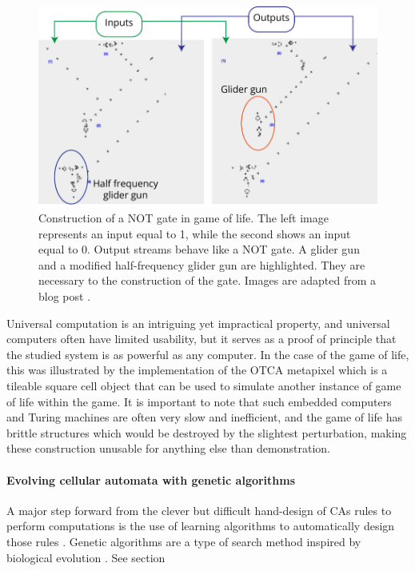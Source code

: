 \begin{figure}[htbp]
  \centering
  \includegraphics[width=.8\linewidth]{figures/gol_not_gate}
  \caption{Construction of a NOT gate in game of life. The left image represents
    an input equal to 1, while the second shows an input equal to 0. Output
    streams behave like a NOT gate. A glider gun and a modified half-frequency
    glider gun are highlighted. They are necessary to the construction of the
    gate. Images are adapted from a blog post
    \parencite{carliniDigitalLogicGates2020}.}
  \label{fig:gol_not_gate}
\end{figure}

Universal computation is an intriguing yet impractical property, and universal
computers often have limited usability, but it serves as a proof of principle
that the studied system is as powerful as any computer. In the case of the game
of life, this was illustrated by the implementation of the OTCA metapixel which
is a tileable square cell object that can be used to simulate another instance
of game of life within the game. It is important to note that such embedded
computers and Turing machines are often very slow and inefficient, and the game
of life has brittle structures which would be destroyed by the slightest
perturbation, making these construction unusable for anything else than
demonstration.

\paragraph{Evolving cellular automata with genetic algorithms}
A major step forward from the clever but difficult hand-design of \acp{CA} rules
to perform computations is the use of learning algorithms to automatically
design those rules \parencite{mitchellEvolvingCellularAutomata1996}. Genetic
algorithms are a type of search method inspired by biological evolution
\parencite{bookerClassifierSystemsGenetic1989}. See section

